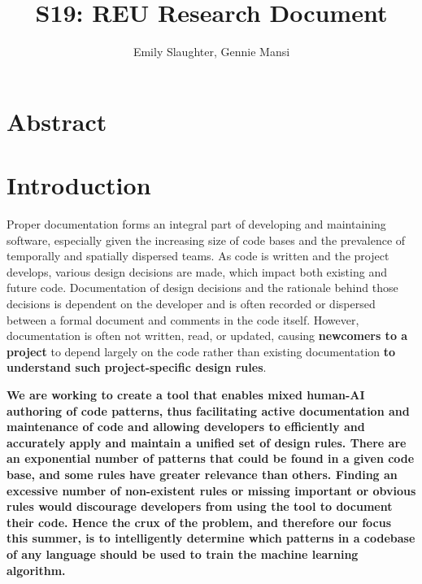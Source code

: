 \documentclass[12pt]{article}
\title{S19: REU Research Document}
\author{Emily Slaughter, Gennie Mansi }
\begin{document}
\maketitle

\clearpage

\tableofcontents

\clearpage

\section{Abstract}



\clearpage
\section{Introduction}

Proper documentation forms an integral part of developing and maintaining software, especially given the increasing size of code bases and the prevalence of temporally and spatially dispersed teams. As code is written and the project develops, various design decisions are made, which impact both existing and future code. Documentation of design decisions and the rationale behind those decisions is dependent on the developer and is often recorded or dispersed between a formal document and comments in the code itself. However, documentation is often not written, read, or updated, causing \textbf{newcomers to a project} to depend largely on the code rather than existing documentation \textbf{to understand such project-specific design rules}.

\textbf{We are working to create a tool that enables mixed human-AI authoring of code patterns, thus facilitating active documentation and maintenance of code and allowing developers to efficiently and accurately apply and maintain a unified set of design rules. There are an exponential number of patterns that could be found in a given code base, and some rules have greater relevance than others. Finding an excessive number of non-existent rules or missing important or obvious rules would discourage developers from using the tool to document their code. Hence the crux of the problem, and therefore our focus this summer, is to intelligently determine which patterns in a codebase of any language should be used to train the machine learning algorithm.}
\end{document}

